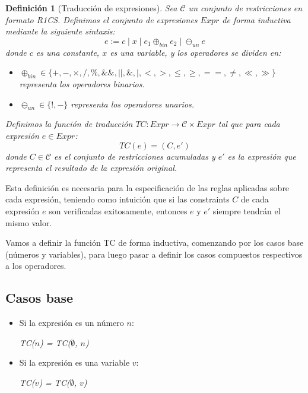 \documentclass[a4paper,12pt]{report}
\newtheorem{definicion}{Definición}
\begin{document}
	\begin{definicion}[Traducción de expresiones]
		\noindent Sea $\mathcal{C}$ un conjunto de restricciones en formato R1CS. Definimos el conjunto de expresiones $Expr$ de forma inductiva mediante la siguiente sintaxis:
		\[ e := c \mid x \mid e_1 \oplus_{bin} e_2 \mid \ominus_{un} e\]
		donde $c$ es una constante, $x$ es una variable, y los operadores se dividen en:
		\begin{itemize}
			\item $\oplus_{bin} \in \{+, -, \times, /, \%, \&\&, ||, \&, |, <, >, \le, \ge, ==, \neq, \ll, \gg\}$ representa los operadores binarios.
			\item $\ominus_{un} \in \{!, -\}$ representa los operadores unarios.
		\end{itemize}
		
		\vspace{0.2cm}
		\noindent Definimos la función de traducción $TC: Expr \to \mathcal{C} \times Expr$ tal que para cada expresión $e \in Expr$:
		\[ TC(e) = (C, e') \]
		donde $C \in \mathcal{C}$ es el conjunto de restricciones acumuladas y $e'$ es la expresión que representa el resultado de la expresión original.
		\label{def:traduccion}
	\end{definicion}
	
	\vspace{0.2cm} 
	
	\noindent Esta definición es necesaria para la especificación de las reglas aplicadas sobre cada expresión, teniendo como intuición que si las constraints $C$ de cada expresión $e$ son verificadas exitosamente, entonces $e$ y $e'$ siempre tendrán el mismo valor.
	
	\vspace{0.2cm} 
	
	\noindent Vamos a definir la función TC de forma inductiva, comenzando por los casos base (números y variables), para luego pasar a definir los casos compuestos respectivos a los operadores.
	
	\subsection*{Casos base} 
	
	\begin{itemize} 
		\item Si la expresión es un número $n$:
		
		\hspace{3em} \textit{TC($n$) = TC($\emptyset$, $n$)} 
		
		\item Si la expresión es una variable $v$:
		
		\hspace{3em} \textit{TC($v$) = TC($\emptyset$, $v$)}
	\end{itemize}
	
\end{document}
